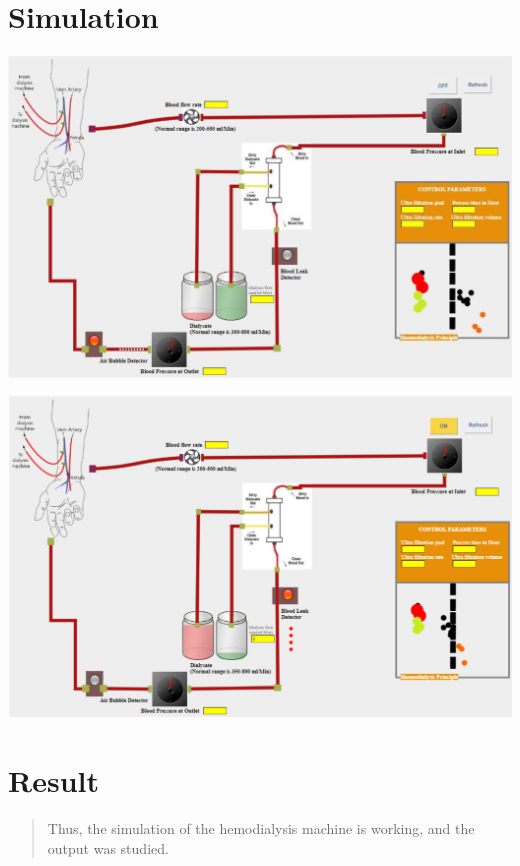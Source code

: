 \documentclass[
  11pt,
  letterpaper,
  DIV=11,
  numbers=noendperiod]{scrreprt}
\begin{document}
\section{Simulation}\label{simulation-3}

\includegraphics[width=6.04167in,height=\textheight]{images/clipboard-2890244601.png}

\includegraphics[width=6.01042in,height=\textheight]{images/clipboard-3169178804.png}

\section{Result}\label{result-8}

\begin{quote}
Thus, the simulation of the hemodialysis machine is working, and the
output was studied.
\end{quote}
\end{document}
